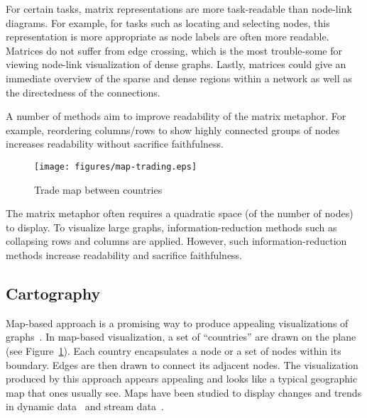 \documentclass[10pt,journal,cspaper,compsoc]{IEEEtran}
\begin{document}
For certain tasks, matrix representations are more task-readable than node-link diagrams. For example, for tasks such as locating and selecting nodes, this representation is more appropriate as node labels are often more readable. Matrices do not suffer from edge crossing, which is the most trouble-some for viewing node-link visualization of dense graphs. Lastly, matrices could give an immediate overview of the sparse and dense regions within a network as well as the directedness of the connections. 

A number of methods aim to improve readability of the matrix metaphor. For example, reordering columns/rows to show highly connected groups of nodes~\cite{peng2004clutter,henry2006matexplorer} increases readability without sacrifice faithfulness.

\begin{figure}\centering
\texttt{[image: figures/map-trading.eps]}
\caption{Trade map between countries~\cite{gansner2010gmap}}\label{fig:gmap}
\end{figure}


The matrix metaphor often requires a quadratic space (of the number of nodes) to display. To visualize large graphs, information-reduction methods such as collapsing rows and columns are applied. However, such information-reduction methods increase readability and sacrifice faithfulness.



\subsection{Cartography}
Map-based approach is a promising way to produce appealing visualizations of graphs~\cite{gansner2010gmap,hu2012embedding,gronemann2012drawing}. 
In map-based visualization, a set of ``countries'' are drawn on the plane (see Figure~\ref{fig:gmap}). Each country encapsulates a node or a set of nodes within its boundary. Edges are then drawn to connect its adjacent nodes.
The visualization produced by this approach appears appealing and looks like a typical geographic map that ones usually see. Maps have been studied to display changes and trends in dynamic data~\cite{mashima2012visualizing} and stream data~\cite{gansner2012visualizing}.
\end{document}
